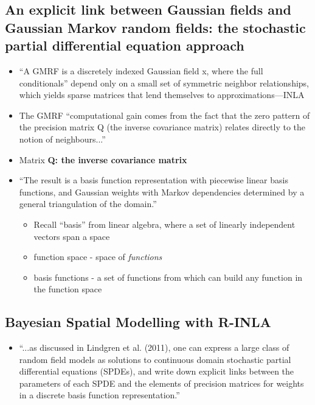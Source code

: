 \documentclass{article}
\begin{document}
\subsection*{An explicit link between Gaussian fields and Gaussian Markov random fields: the stochastic partial differential equation approach \citep{Lindgren2011}}
\begin{itemize}
\item ``A GMRF is a discretely indexed Gaussian field x, where the full conditionals'' depend only on a small set of symmetric neighbor relationships, which yields sparse matrices that lend themselves to approximations---INLA
\item The GMRF ``computational gain comes from the fact that the zero pattern of the precision matrix Q (the inverse covariance matrix) relates directly to the notion of neighbours...''
\item Matrix {\bf Q: the inverse covariance matrix}
\item ``The result is a basis function representation with piecewise linear basis functions, and Gaussian weights with Markov dependencies determined by a general triangulation of the domain.'' \citep{Lindgren2011}
  \begin{itemize}
  \item Recall ``basis'' from linear algebra, where a set of linearly independent vectors span a space
  \item function space - space of {\it functions}
  \item basis functions - a set of functions from which can build any function in the function space
  \end{itemize}
\end{itemize}

\subsection*{Bayesian Spatial Modelling with R-INLA \citep{Lindgren2015}}
\begin{itemize}
\item ``...as discussed in Lindgren et al. (2011), one can express a large class of random field models as solutions to continuous domain stochastic partial differential equations (SPDEs), and write down explicit links between the parameters of each SPDE and the elements of precision matrices for weights in a discrete basis function representation.''
\end{itemize}
\end{document}
